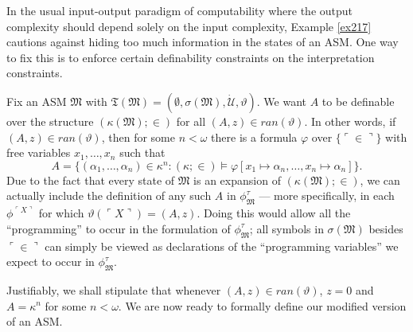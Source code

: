 \documentclass[12pt, twoside]{memoir}
\numberwithin{equation}{section}
\theoremstyle{definition}
\theoremstyle{remark}
\theoremstyle{definition}
\theoremstyle{definition}
\theoremstyle{definition}
\theoremstyle{remark}
\begin{document}
In the usual input-output paradigm of computability where the output complexity should depend solely on the input complexity, Example \ref{ex217} cautions against hiding too much information in the states of an ASM. One way to fix this is to enforce certain definability constraints on the interpretation constraints. 

Fix an ASM $\mathfrak{M}$ with $\mathfrak{T}(\mathfrak{M}) = (\emptyset, \sigma(\mathfrak{M}), \dot{\mathcal{U}}, \vartheta)$. We want $A$ to be definable over the structure $(\kappa(\mathfrak{M}); \in)$ for all $(A, z) \in ran(\vartheta)$. In other words, if $(A, z) \in ran(\vartheta)$, then for some $n < \omega$ there is a formula $\varphi$ over $\{\ulcorner \in \urcorner\}$ with free variables $x_1, \dots, x_n$ such that 
\begin{equation*}
    A = \{(\alpha_1, \dots, \alpha_n) \in \kappa^n : (\kappa; \in) \models \varphi[x_1 \mapsto \alpha_n, \dots, x_n \mapsto \alpha_n]\} \text{.}
\end{equation*}
Due to the fact that every state of $\mathfrak{M}$ is an expansion of $(\kappa(\mathfrak{M}); \in)$, we can actually include the definition of any such $A$ in $\phi^{\tau}_{\mathfrak{M}}$ --- more specifically, in each $\phi^{\ulcorner X \urcorner}$ for which $\vartheta(\ulcorner X \urcorner) = (A, z)$. Doing this would allow all the ``programming'' to occur in the formulation of $\phi^{\tau}_{\mathfrak{M}}$; all symbols in $\sigma(\mathfrak{M})$ besides $\ulcorner \in \urcorner$ can simply be viewed as declarations of the ``programming variables'' we expect to occur in $\phi^{\tau}_{\mathfrak{M}}$. 

Justifiably, we shall stipulate that whenever $(A, z) \in ran(\vartheta)$, $z = 0$ and $A = \kappa^n$ for some $n < \omega$. We are now ready to formally define our modified version of an ASM.
\end{document}
